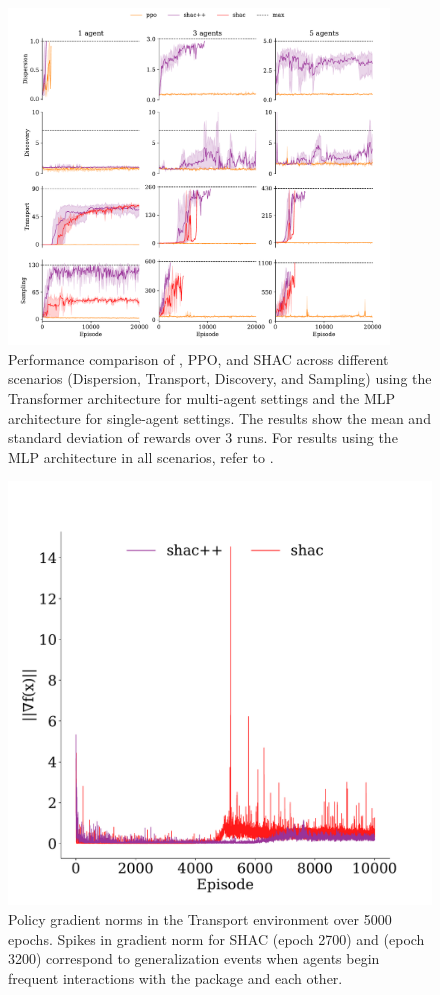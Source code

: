 \begin{figure}[t]
    \centering
    \includegraphics[width=0.9\textwidth]{figs/main-transformer.pdf}
    \caption{Performance comparison of \fname{}, PPO, and SHAC across different scenarios (Dispersion, Transport, Discovery, and Sampling) using the Transformer architecture for multi-agent settings and the MLP architecture for single-agent settings. The results show the mean and standard deviation of rewards over 3 runs. For results using the MLP architecture in all scenarios, refer to .}%
    \label{fig:experiments}
\end{figure}

\begin{figure}[t]
    \centering
    \includegraphics[width=0.9\columnwidth]{figs/grads-transformer-transport.pdf}
    \caption{Policy gradient norms in the Transport environment over 5000 epochs. Spikes in gradient norm for SHAC (epoch 2700) and \fname{} (epoch 3200) correspond to generalization events when agents begin frequent interactions with the package and each other.}\label{fig:grads-transformer-transport}
    \vspace{0.5cm}
\end{figure}

